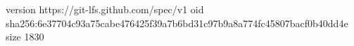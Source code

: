 version https://git-lfs.github.com/spec/v1
oid sha256:6e37704c93a75cabe476425f39a7b6bd31c97b9a8a774fc45807bacf0b40dd4e
size 1830
